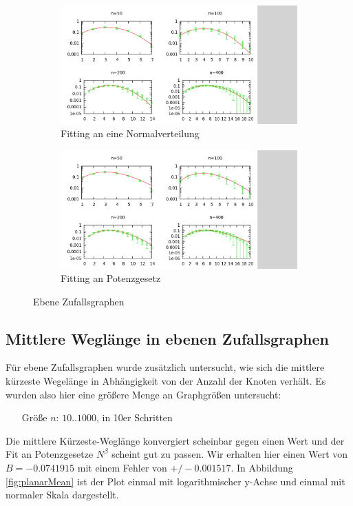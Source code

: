 \documentclass[10pt]{article}
\begin{document}
\begin{figure}[htb!]
\begin{subfigure}{.5\textwidth}
  \centering
  \includegraphics[width=1\linewidth]{../Results/wErrorbars_Normal_Planar.png}
  \caption{Fitting an eine Normalverteilung}
\end{subfigure}%
\begin{subfigure}{.5\textwidth}
  \centering
  \includegraphics[width=1\linewidth]{../Results/wErrorbars_Power_Planar.png}
  \caption{Fitting an Potenzgesetz}
\end{subfigure}
\caption{Ebene Zufallsgraphen}
\label{fig:planar}
\end{figure}

\subsection{Mittlere Weglänge in ebenen Zufallsgraphen}
Für ebene Zufallsgraphen wurde zusätzlich untersucht, wie sich die mittlere kürzeste Wegelänge in Abhängigkeit von der Anzahl der Knoten verhält. Es wurden also hier eine größere Menge an Graphgrößen untersucht:
\begin{itemize}
\item[\quad Größe $n$:] $10..1000$, in 10er Schritten
\end{itemize}
Die mittlere Kürzeste-Weglänge konvergiert scheinbar gegen einen Wert und der Fit an Potenzgesetze $N^\beta$ scheint gut zu passen. Wir erhalten hier einen Wert von $B= -0.0741915$ mit einem Fehler von $+/- 0.001517$. In Abbildung \ref{fig:planarMean} ist der Plot einmal mit logarithmischer y-Achse und einmal mit normaler Skala dargestellt.
\end{document}

